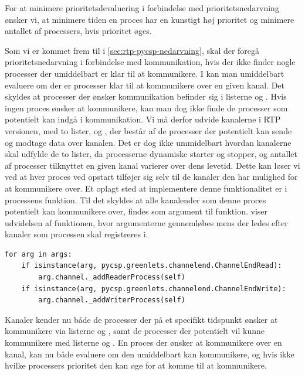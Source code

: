 For at minimere prioritetsdevaluering i forbindelse med prioritetsnedarvning  ønsker vi, at minimere tiden en proces har en kunstigt høj prioritet og minimere antallet af processers, hvis prioritet øges. 

Som vi er kommet frem til i \cref{sec:rtp-pycsp-nedarvning}, skal  der foregå  prioritetsnedarvning i forbindelse med kommunikation, hvis der ikke finder nogle processer der umiddelbart er klar til at kommunikere.  I \pycsp kan man umiddelbart evaluere om der er processer klar til at kommunikere over en given kanal. Det skyldes at processer der ønsker kommunikation befinder sig i listerne  og . Hvis ingen proces ønsker at kommunikere, kan man dog ikke finde de processer som potentielt kan indgå i kommunikation.
Vi må derfor udvide kanalerne i RTP versionen, med to lister,  og , der består af de processer der potentielt kan sende og modtage data over kanalen. 
Det er dog ikke ummidelbart hvordan kanalerne skal udfylde de to lister, da processerne dynamiske starter og stopper, og antallet af processer tilknyttet en given kanal varierer over dens levetid.
Dette kan løser vi ved at hver proces ved opstart tilføjer sig selv til de kanaler den har mulighed for at kommunikere over. Et oplagt sted at implementere denne funktionalitet er i processens    funktion. Til det skyldes at alle kanalender som denne proces potentielt kan kommunikere over, findes som argument til   funktion.  viser udvidelsen af funktionen, hvor argumenterne gennemløbes mens der ledes efter kanaler som processen skal registreres i.

\begin{lstlisting}[firstnumber=29 ,float=hbtp, label=lst:process-init, caption=Uddrag af \code{Process}' \code{\_\_init\_\_}funktion]
for arg in args:
    if isinstance(arg, pycsp.greenlets.channelend.ChannelEndRead):
        arg.channel._addReaderProcess(self)
    if isinstance(arg, pycsp.greenlets.channelend.ChannelEndWrite):
        arg.channel._addWriterProcess(self)  
\end{lstlisting}

Kanaler kender nu  både de processer der på et specifikt tidspunkt ønsker at kommunikere via listerne  og , samt de processer der potentielt vil kunne kommunikere med listerne  og . En proces der ønsker at kommunikere over en kanal, kan nu  både evaluere om den umiddelbart kan kommunikere, og hvis ikke hvilke processers  prioritet den kan øge for at komme til at kommunikere.

